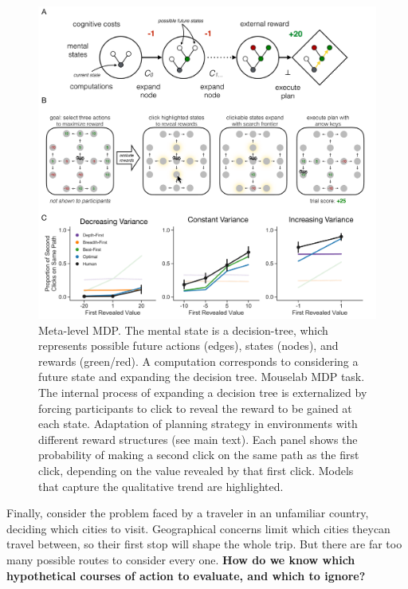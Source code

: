\documentclass[11pt,a4paperpaper,]{article}
\begin{document}
\begin{figure}[ph]
  \centering
  \includegraphics[width=\textwidth]{diagrams/precis/planning.pdf}
  \caption{
     Meta-level MDP. The mental state is a decision-tree, which represents possible future actions (edges), states (nodes), and rewards (green/red). A computation corresponds to considering a future state and expanding the decision tree.
     Mouselab MDP task. The internal process of expanding a decision tree is externalized by forcing participants to click to reveal the reward to be gained at each state.
     Adaptation of planning strategy in environments with different reward structures (see main text). Each panel shows the probability of making a second click on the same path as the first click, depending on the value revealed by that first click. Models that capture the qualitative trend are highlighted. %
  }
  \label{fig:planning}
\end{figure}


Finally, consider the problem faced by a traveler in an unfamiliar country, deciding which cities to visit. Geographical concerns limit which cities theycan travel between, so their first stop will shape the whole trip. But there are far too many possible routes to consider every one. \textbf{How do we know which hypothetical courses of action to evaluate, and which to ignore?}
\end{document}
